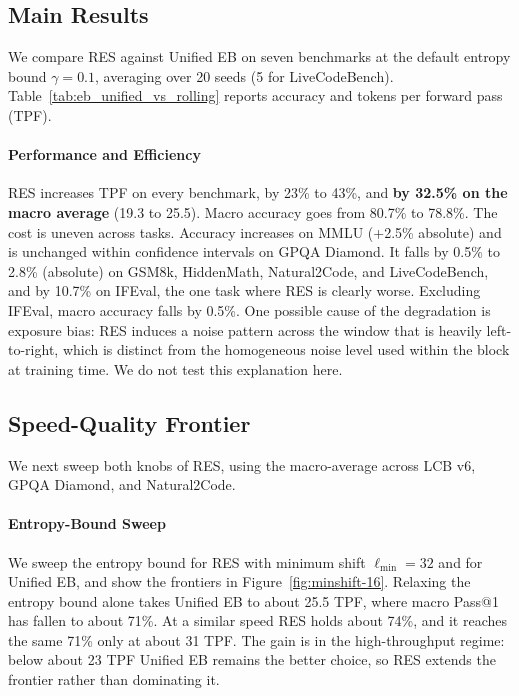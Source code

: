 
\subsection{Main Results}
We compare RES against Unified EB on seven benchmarks at the default entropy bound $\gamma = 0.1$, averaging over 20 seeds (5 for LiveCodeBench).
Table~\ref{tab:eb_unified_vs_rolling} reports accuracy and tokens per forward pass (TPF).



\paragraph{Performance and Efficiency}
RES increases TPF on every benchmark, by 23\% to 43\%, and \textbf{by 32.5\% on the macro average} (19.3 to 25.5).
Macro accuracy goes from 80.7\% to 78.8\%.
The cost is uneven across tasks.
Accuracy increases on MMLU (+2.5\% absolute) and is unchanged within confidence intervals on GPQA Diamond.
It falls by 0.5\% to 2.8\% (absolute) on GSM8k, HiddenMath, Natural2Code, and LiveCodeBench, and by 10.7\% on IFEval, the one task where RES is clearly worse.
Excluding IFEval, macro accuracy falls by 0.5\%.
One possible cause of the degradation is exposure bias: RES induces a noise pattern across the window that is heavily left-to-right, which is distinct from the homogeneous noise level used within the block at training time.
We do not test this explanation here.

\subsection{Speed-Quality Frontier}
We next sweep both knobs of RES, using the macro-average across LCB v6, GPQA Diamond, and Natural2Code.



\paragraph{Entropy-Bound Sweep}
We sweep the entropy bound for RES with minimum shift $\ell_{\min}=32$ and for Unified EB, and show the frontiers in Figure~\ref{fig:minshift-16}.
Relaxing the entropy bound alone takes Unified EB to about 25.5 TPF, where macro Pass@1 has fallen to about 71\%.
At a similar speed RES holds about 74\%, and it reaches the same 71\% only at about 31 TPF.
The gain is in the high-throughput regime: below about 23 TPF Unified EB remains the better choice, so RES extends the frontier rather than dominating it.

